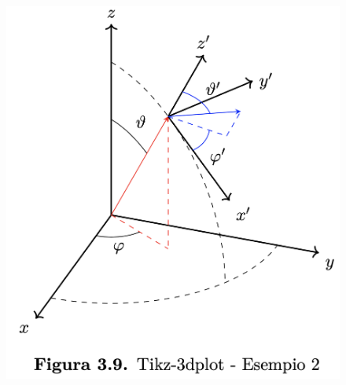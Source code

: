\begin{figure}[ht]\centering
\includegraphics[scale=.25]{FileAusiliari/Screenshots/Figura3-9.png}
\end{figure}